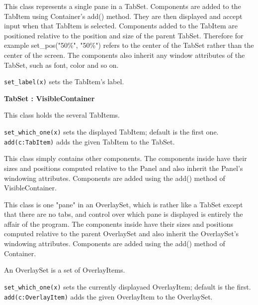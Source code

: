 
This class represents a single pane in a TabSet. Components are added to
the TabItem using Container's add() method. They are
then displayed and accept input when that TabItem is selected.
Components added to the TabItem are positioned relative to the position
and size of the parent TabSet. Therefore for example
set\_pos("50\%",
"50\%") refers to the center of the TabSet
rather than the center of the screen. The components also inherit any
window attributes of the TabSet, such as font, color and so on.

\texttt{set\_label(x)} sets the TabItem's label.

{\ttfamily\bfseries
{}TabSet : VisibleContainer}

This class holds the several TabItems.

\texttt{set\_which\_one(x)} sets the displayed TabItem;
default is the first one.\\
\texttt{add(c:TabItem)} adds the given TabItem to the TabSet.


This class simply contains other components. The components inside have
their sizes and positions computed relative to the Panel and also
inherit the Panel's windowing attributes. Components
are added using the add() method of VisibleContainer.


This class is one "pane" in an OverlaySet,
which is rather like a TabSet except that there are no tabs, and
control over which pane is displayed is entirely the affair of the
program. The components inside have their sizes and positions computed
relative to the parent OverlaySet and also inherit the
OverlaySet's windowing attributes. Components are
added using the add() method of Container.


An OverlaySet is a set of OverlayItems.

\texttt{set\_which\_one(x)} sets the currently displayaed OverlayItem;
default is the first.\\
\texttt{add(c:OverlayItem)} adds the given OverlayItem to the OverlaySet.
